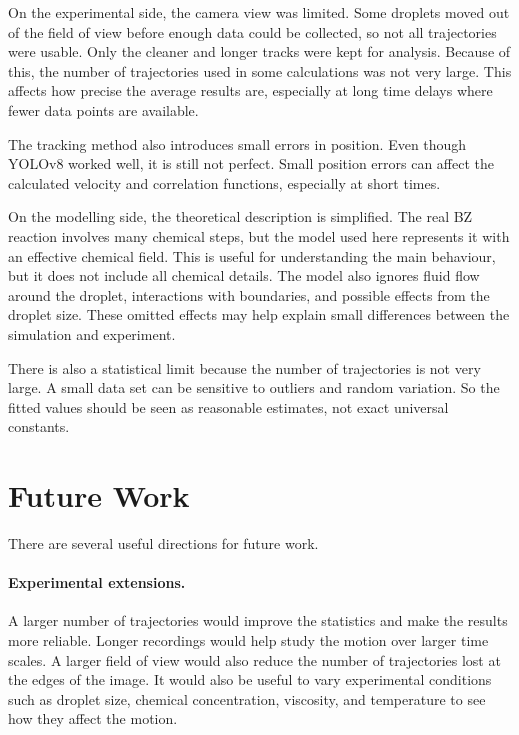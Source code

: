 On the experimental side, the camera view was limited. Some droplets moved out of the field of view before enough data could be collected, so not all trajectories were usable. Only the cleaner and longer tracks were kept for analysis. Because of this, the number of trajectories used in some calculations was not very large. This affects how precise the average results are, especially at long time delays where fewer data points are available.

The tracking method also introduces small errors in position. Even though YOLOv8 worked well, it is still not perfect. Small position errors can affect the calculated velocity and correlation functions, especially at short times.

On the modelling side, the theoretical description is simplified. The real BZ reaction involves many chemical steps, but the model used here represents it with an effective chemical field. This is useful for understanding the main behaviour, but it does not include all chemical details. The model also ignores fluid flow around the droplet, interactions with boundaries, and possible effects from the droplet size. These omitted effects may help explain small differences between the simulation and experiment.

There is also a statistical limit because the number of trajectories is not very large. A small data set can be sensitive to outliers and random variation. So the fitted values should be seen as reasonable estimates, not exact universal constants.

\section{Future Work}
\label{sec:future}

There are several useful directions for future work.

\paragraph{Experimental extensions.}
A larger number of trajectories would improve the statistics and make the results more reliable. Longer recordings would help study the motion over larger time scales. A larger field of view would also reduce the number of trajectories lost at the edges of the image. It would also be useful to vary experimental conditions such as droplet size, chemical concentration, viscosity, and temperature to see how they affect the motion.

